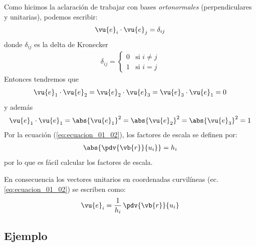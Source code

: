 \par
Como hicimos la aclaración de trabajar con bases \emph{ortonormales} (perpendiculares y unitarias), podemos escribir:
\begin{align}
\vu{e}_{i} \cdot \vu{e}_{j} = \delta_{ij}
\label{eq:ecuacion_01_03}
\end{align}
donde $\delta_{ij}$ es la delta de Kronecker
\begin{align*}
\delta_{ij} = 
\begin{cases}
0 & \mbox{si } i \neq j \\
1 & \mbox{si } i = j
\end{cases}
\end{align*}
Entonces tendremos que
\begin{align*}
\vu{e}_{1} \cdot \vu{e}_{2} = \vu{e}_{2} \cdot \vu{e}_{3} = \vu{e}_{3} \cdot \vu{e}_{1} = 0  
\end{align*}
y además
\begin{align*}
\vu{e}_{1} \cdot \vu{e}_{1} = \abs{\vu{e}_{1}}^{2} = \abs{\vu{e}_{2}}^{2} = \abs{\vu{e}_{3}}^{2} = 1
\end{align*}
Por la ecuación (\ref{eq:ecuacion_01_02}), los factores de escala se definen por:
\begin{align}
\abs{\pdv{\vb{r}}{u_{i}}} = h_{i}
\label{eq:ecuacion_01_04}
\end{align}
por lo que es fácil calcular los factores de escala.
\par
En consecuencia los vectores unitarios en coordenadas curvilíneas (ec. \ref{eq:ecuacion_01_02}) se escriben como:
\begin{align}
\vu{e}_{i} = \dfrac{1}{h_{i}} \, \pdv{\vb{r}}{u_{i}}
\label{eq:ecuacion_01_05}
\end{align}

\subsection*{Ejemplo}

